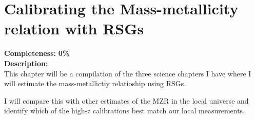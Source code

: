 \chapter{Calibrating the Mass-metallicity relation with RSGs}

\textbf{Completeness:} \textbf{0\%} \\


\textbf{Description:} \\
This chapter will be a compilation of the three science chapters I have
where I will estimate the mass-metallictiy relatioship using RSGs.

I will compare this with other estimates of the MZR in the local universe and
identify which of the high-z calibrations best match our local measurements.

